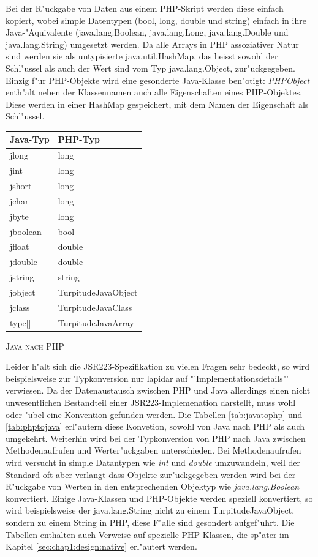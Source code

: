 Bei der R"uckgabe von Daten aus einem PHP-Skript werden diese einfach kopiert, wobei simple Datentypen (bool, long, double und string)
einfach in ihre Java-"Aquivalente (java.lang.Boolean, java.lang.Long, java.lang.Double und java.lang.String) umgesetzt werden.
Da alle Arrays in PHP assoziativer Natur sind werden sie als untypisierte java.util.HashMap, das heisst sowohl der Schl"ussel als auch der Wert
sind vom Typ java.lang.Object, zur"uckgegeben. Einzig f"ur PHP-Objekte wird eine gesonderte Java-Klasse ben"otigt: \emph{PHPObject} enth"alt neben
der Klassennamen auch alle Eigenschaften eines PHP-Objektes. Diese werden in einer HashMap gespeichert, mit dem Namen der Eigenschaft
als Schl"ussel.
\begin{floatingtable}{
\label{tab:javatophp}
\begin{tabular}{|l|l|}
\hline
Java-Typ & PHP-Typ\\
\hline\hline
jlong & long\\
jint & long\\
jshort & long\\
jchar & long\\
jbyte & long\\
jboolean & bool\\
jfloat & double\\
jdouble & double\\
jstring & string\\
jobject & TurpitudeJavaObject\\
jclass & TurpitudeJavaClass\\
type[] & TurpitudeJavaArray\\
\hline
\end{tabular}}
\caption{\textsc{Java nach PHP}}
\end{floatingtable}
Leider h"alt sich die JSR223-Spezifikation zu vielen Fragen sehr bedeckt, so wird beispielsweise zur Typkonversion nur lapidar auf 
"'Implementationsdetails"' verwiesen. Da der Datenaustausch zwischen PHP und Java allerdings einen nicht unwesentlichen Bestandteil
einer JSR223-Implemenation darstellt, muss wohl oder "ubel eine Konvention gefunden werden. Die Tabellen \ref{tab:javatophp} und \ref{tab:phptojava}
erl"autern diese Konvetion, sowohl von Java nach PHP als auch umgekehrt. Weiterhin wird bei der Typkonversion von PHP nach Java zwischen 
Methodenaufrufen und Werter"uckgaben unterschieden. Bei Methodenaufrufen wird versucht in simple Datantypen wie \emph{int} und \emph{double}
umzuwandeln, weil der Standard oft aber verlangt dass Objekte zur"uckgegeben werden wird bei der R"uckgabe von Werten in den entsprechenden
Objektyp wie \emph{java.lang.Boolean} konvertiert. Einige Java-Klassen und PHP-Objekte werden speziell konvertiert, so wird beispielsweise
der java.lang.String nicht zu einem TurpitudeJavaObject, sondern zu einem String in PHP, diese F"alle sind gesondert aufgef"uhrt. Die
Tabellen enthalten auch Verweise auf spezielle PHP-Klassen, die sp"ater im Kapitel \ref{sec:chap1:design:native} erl"autert werden.

